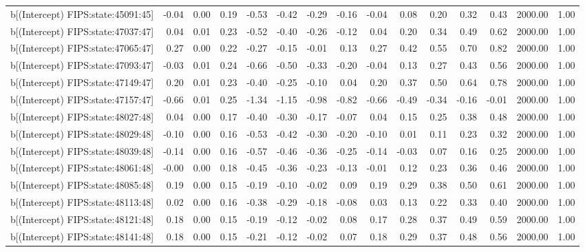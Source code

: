 \begin{table}[ht]
\begin{tabular}{rrrrrrrrrrrrrrr}
  b[(Intercept) FIPS:state:45091:45] & -0.04 & 0.00 & 0.19 & -0.53 & -0.42 & -0.29 & -0.16 & -0.04 & 0.08 & 0.20 & 0.32 & 0.43 & 2000.00 & 1.00 \\ 
  b[(Intercept) FIPS:state:47037:47] & 0.04 & 0.01 & 0.23 & -0.52 & -0.40 & -0.26 & -0.12 & 0.04 & 0.20 & 0.34 & 0.49 & 0.62 & 2000.00 & 1.00 \\ 
  b[(Intercept) FIPS:state:47065:47] & 0.27 & 0.00 & 0.22 & -0.27 & -0.15 & -0.01 & 0.13 & 0.27 & 0.42 & 0.55 & 0.70 & 0.82 & 2000.00 & 1.00 \\ 
  b[(Intercept) FIPS:state:47093:47] & -0.03 & 0.01 & 0.24 & -0.66 & -0.50 & -0.33 & -0.20 & -0.04 & 0.13 & 0.27 & 0.43 & 0.56 & 2000.00 & 1.00 \\ 
  b[(Intercept) FIPS:state:47149:47] & 0.20 & 0.01 & 0.23 & -0.40 & -0.25 & -0.10 & 0.04 & 0.20 & 0.37 & 0.50 & 0.64 & 0.78 & 2000.00 & 1.00 \\ 
  b[(Intercept) FIPS:state:47157:47] & -0.66 & 0.01 & 0.25 & -1.34 & -1.15 & -0.98 & -0.82 & -0.66 & -0.49 & -0.34 & -0.16 & -0.01 & 2000.00 & 1.00 \\ 
  b[(Intercept) FIPS:state:48027:48] & 0.04 & 0.00 & 0.17 & -0.40 & -0.30 & -0.17 & -0.07 & 0.04 & 0.15 & 0.25 & 0.38 & 0.48 & 2000.00 & 1.00 \\ 
  b[(Intercept) FIPS:state:48029:48] & -0.10 & 0.00 & 0.16 & -0.53 & -0.42 & -0.30 & -0.20 & -0.10 & 0.01 & 0.11 & 0.23 & 0.32 & 2000.00 & 1.00 \\ 
  b[(Intercept) FIPS:state:48039:48] & -0.14 & 0.00 & 0.16 & -0.57 & -0.46 & -0.36 & -0.25 & -0.14 & -0.03 & 0.07 & 0.16 & 0.25 & 2000.00 & 1.00 \\ 
  b[(Intercept) FIPS:state:48061:48] & -0.00 & 0.00 & 0.18 & -0.45 & -0.36 & -0.23 & -0.13 & -0.01 & 0.12 & 0.23 & 0.36 & 0.46 & 2000.00 & 1.00 \\ 
  b[(Intercept) FIPS:state:48085:48] & 0.19 & 0.00 & 0.15 & -0.19 & -0.10 & -0.02 & 0.09 & 0.19 & 0.29 & 0.38 & 0.50 & 0.61 & 2000.00 & 1.00 \\ 
  b[(Intercept) FIPS:state:48113:48] & 0.02 & 0.00 & 0.16 & -0.38 & -0.29 & -0.18 & -0.08 & 0.03 & 0.13 & 0.22 & 0.33 & 0.40 & 2000.00 & 1.00 \\ 
  b[(Intercept) FIPS:state:48121:48] & 0.18 & 0.00 & 0.15 & -0.19 & -0.12 & -0.02 & 0.08 & 0.17 & 0.28 & 0.37 & 0.49 & 0.59 & 2000.00 & 1.00 \\ 
  b[(Intercept) FIPS:state:48141:48] & 0.18 & 0.00 & 0.15 & -0.21 & -0.12 & -0.02 & 0.07 & 0.18 & 0.29 & 0.37 & 0.48 & 0.56 & 2000.00 & 1.00 \\ 

\end{tabular}
\end{table}
